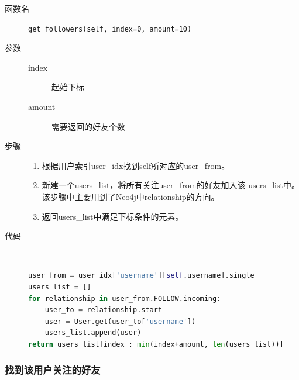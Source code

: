\documentclass{yaldc}
\begin{document}
\begin{description}
    \item[函数名] \verb|get_followers(self, index=0, amount=10)|
    \item[参数]
        \begin{description}
            \item[index] 起始下标
            \item[amount] 需要返回的好友个数
        \end{description}
    \item[步骤]
        \begin{enumerate}
            \item 根据用户索引user\_idx找到self所对应的user\_from。
            \item 新建一个users\_list，将所有关注user\_from的好友加入该
                users\_list中。该步骤中主要用到了Neo4j中relationship的方向。
            \item 返回users\_list中满足下标条件的元素。
        \end{enumerate}
    \item[代码] ~
        \begin{lstlisting}[language=Python]
user_from = user_idx['username'][self.username].single
users_list = []
for relationship in user_from.FOLLOW.incoming:
    user_to = relationship.start
    user = User.get(user_to['username'])
    users_list.append(user)
return users_list[index : min(index+amount, len(users_list))]
        \end{lstlisting}
\end{description}

\subsubsection{找到该用户关注的好友}
\end{document}
